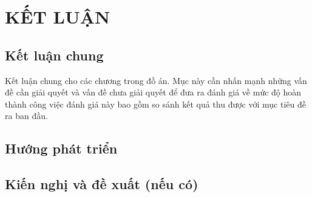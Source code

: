 \section*{\centering KẾT LUẬN}
\subsection*{Kết luận chung}
Kết luận chung cho các chương trong đồ án. Mục này cần nhấn mạnh những vấn đề cần giải quyết và vấn đề chưa giải quyết để đưa ra đánh giá về mức độ hoàn thành công việc đánh giá này bao gồm so sánh kết quả thu được với mục tiêu đề ra ban đầu.
\subsection*{Hướng phát triển}
\subsection*{Kiến nghị và đề xuất (nếu có)}
\cleardoublepage